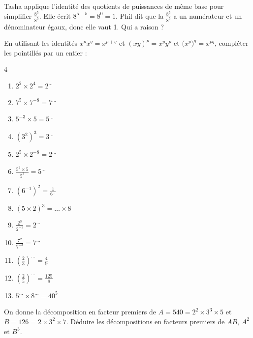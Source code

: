\documentclass[main.tex]{subfiles}
\begin{document}
\begin{cBox}
	Tasha applique l'identité des quotients de puissances de même base pour simplifier $\frac{8^5}{8^5}$. Elle écrit $8^{5-5}=8^0=1$. Phil dit que la  $\frac{8^5}{8^5}$ a un numérateur et un dénominateur égaux, donc elle vaut 1. Qui a raison ?
\end{cBox}
 
\begin{exercise}[\cancel{\faCalculator}] En utilisant les identités $x^p x^q=x^{p+q}$  et $(xy)^p=x^p y^p$ et $\big(x^p\big)^q=x^{pq}$, compléter les pointillés par un entier :
	
	\begin{multicols}{4}
		\begin{enumerate}[label={\alph*)\rule{0pt}{2.0em}},leftmargin=*] 
			\item $2^2\times 2^4=2^{\ldots}$
			\item $7^{5}\times 7^{-8}=7^{\ldots}$ 
			\item $5^{-3}\times 5=5^{\ldots}$ 
			\item $(3^2)^3=3^{\ldots}$
			\item $2^5\times 2^{-8}=2^{\ldots}$
			\item $\frac{5^2\times 5}{5^3}=5^{\ldots}$
			\item $(6^{-1})^2=\frac{1}{6^{\ldots}}$
			\item $(5\times 2)^3=\ldots \times 8$
			\item $\frac{2^3}{2^{-1}}=2^{\ldots}$
			\item $\frac{7^2}{7^{-3}}=7^{\ldots}$
			\item $\left(\frac{2}{3}\right)^{\ldots} =\frac{4}{9}$
			\item $\left(\frac{2}{5}\right)^{\ldots} =\frac{125}{8}$
			\item $5^{\ldots}\times 8^{\ldots}= 40^{5}$
		\end{enumerate}
	\end{multicols}
\end{exercise}
\begin{exercise}[\cancel{\faCalculator}] On donne la décomposition en facteur premiers de $A=540=2^2\times 3^3\times 5$ et $B=126=2\times 3^2\times 7$. Déduire les décompositions en facteurs premiers de $AB$, $A^2$ et $B^3$.
\end{exercise}  
\end{document}
